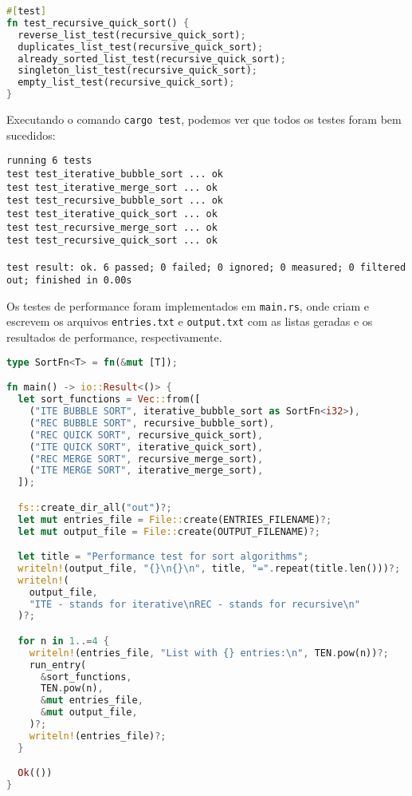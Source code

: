 \begin{lstlisting}[language=Rust, caption={Trecho de \texttt{test\_sorts.rs}}]
#[test]
fn test_recursive_quick_sort() {
  reverse_list_test(recursive_quick_sort);
  duplicates_list_test(recursive_quick_sort);
  already_sorted_list_test(recursive_quick_sort);
  singleton_list_test(recursive_quick_sort);
  empty_list_test(recursive_quick_sort);
}
\end{lstlisting}
\FloatBarrier
\noindent
Executando o comando \texttt{cargo test}, podemos ver que todos os testes foram bem sucedidos:

\begin{lstlisting}
running 6 tests
test test_iterative_bubble_sort ... ok
test test_iterative_merge_sort ... ok
test test_recursive_bubble_sort ... ok
test test_iterative_quick_sort ... ok
test test_recursive_merge_sort ... ok
test test_recursive_quick_sort ... ok

test result: ok. 6 passed; 0 failed; 0 ignored; 0 measured; 0 filtered out; finished in 0.00s
\end{lstlisting}
\FloatBarrier
\noindent
Os testes de performance foram implementados em \texttt{main.rs}, onde criam e escrevem os arquivos \texttt{entries.txt} e \texttt{output.txt} com as listas geradas e os resultados de performance, respectivamente.

\begin{lstlisting}[language=Rust, caption={Trecho de \texttt{main.rs}}]
type SortFn<T> = fn(&mut [T]);

fn main() -> io::Result<()> {
  let sort_functions = Vec::from([
    ("ITE BUBBLE SORT", iterative_bubble_sort as SortFn<i32>),
    ("REC BUBBLE SORT", recursive_bubble_sort),
    ("REC QUICK SORT", recursive_quick_sort),
    ("ITE QUICK SORT", iterative_quick_sort),
    ("REC MERGE SORT", recursive_merge_sort),
    ("ITE MERGE SORT", iterative_merge_sort),
  ]);

  fs::create_dir_all("out")?;
  let mut entries_file = File::create(ENTRIES_FILENAME)?;
  let mut output_file = File::create(OUTPUT_FILENAME)?;

  let title = "Performance test for sort algorithms";
  writeln!(output_file, "{}\n{}\n", title, "=".repeat(title.len()))?;
  writeln!(
    output_file,
    "ITE - stands for iterative\nREC - stands for recursive\n"
  )?;

  for n in 1..=4 {
    writeln!(entries_file, "List with {} entries:\n", TEN.pow(n))?;
    run_entry(
      &sort_functions,
      TEN.pow(n),
      &mut entries_file,
      &mut output_file,
    )?;
    writeln!(entries_file)?;
  }

  Ok(())
}
\end{lstlisting}
\FloatBarrier
